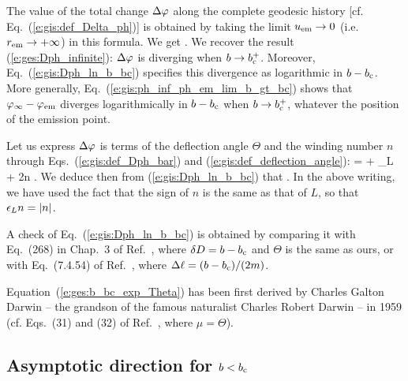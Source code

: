 The value of the total change $\Delta\varphi$ along the complete geodesic history
[cf. Eq.~(\ref{e:gis:def_Delta_ph})]
is obtained by taking the limit $u_{\rm em}\to 0$ (i.e. $r_{\rm em} \to +\infty$)
in this formula. We get
\be \label{e:gis:Dph_ln_b_bc}
    .
\ee
We recover the result (\ref{e:ges:Dph_infinite}): $\Delta\varphi$ is diverging
when $b\to b_{\rm c}^+$. Moreover, Eq.~(\ref{e:gis:Dph_ln_b_bc}) specifies
this divergence as logarithmic in $b - b_{\rm c}$. More generally,
Eq.~(\ref{e:gis:ph_inf_ph_em_lim_b_gt_bc}) shows that $\varphi_\infty - \varphi_{\rm em}$
diverges logarithmically in $b - b_{\rm c}$ when $b\to b_{\rm c}^+$, whatever the position
of the emission point.

Let us express $\Delta\varphi$ is terms of the deflection angle $\Theta$ and
the winding number $n$ through Eqs.~(\ref{e:gis:def_Dph_bar}) and
(\ref{e:gis:def_deflection_angle}):
\be
    \Delta\ph = \Theta + \eps_L \pi + 2\pi n .
\ee
We deduce then from (\ref{e:gis:Dph_ln_b_bc}) that
\be \label{e:ges:b_bc_exp_Theta}
   .
\ee
In the above writing, we have used the fact that the sign of $n$ is the same
as that of $L$, so that $\epsilon_L n = |n|$.
\begin{remark}
A check of Eq.~(\ref{e:gis:Dph_ln_b_bc}) is obtained by comparing it with
Eq.~(268) in Chap.~3 of Ref.~\cite{Chand83}, where $\delta D = b-b_{\rm c}$ and
$\Theta$ is the same as ours, or with Eq.~(7.4.54) of Ref.~\cite{FroloZ11},
where $\Delta\ell = (b - b_{\rm c})/(2 m)$.
\end{remark}

\begin{hist} \label{h:gis:Darwin_formula}
Equation~(\ref{e:ges:b_bc_exp_Theta}) has been first derived by
Charles Galton Darwin -- the grandson of the famous naturalist Charles Robert Darwin -- in 1959 \cite{Darwi59} (cf. Eqs.~(31) and (32) of Ref.~\cite{Darwi59}, where $\mu = \Theta$).
\end{hist}


\subsection{Asymptotic direction for \texorpdfstring{$b < b_{\rm c}$}{b<bc}}

